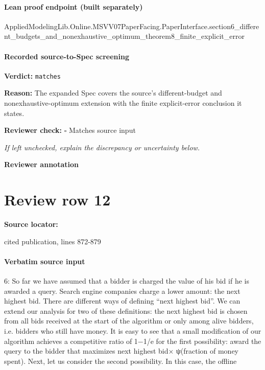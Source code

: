 \documentclass[10pt]{article}
\newcommand{\reviewerbox}{%
  \par\noindent\fbox{\parbox{0.96\linewidth}{\rule{0pt}{0.38in}}}\par
}
\newcommand{\reviewmatch}[1]{%
  \par\noindent\textbf{Reviewer check:} $\square$\; #1\par
  \noindent\emph{If left unchecked, explain the discrepancy or uncertainty below.}\par
}
\begin{document}
\paragraph{Lean proof endpoint (built separately)}\begin{ReviewVerbatim}
AppliedModelingLib.Online.MSVV07PaperFacing.PaperInterface.section6_different_budgets_and_nonexhaustive_optimum_theorem8_finite_explicit_error
\end{ReviewVerbatim}

\paragraph{Recorded source-to-Spec screening}
\textbf{Verdict:} \texttt{matches}
\\
{\raggedright
\textbf{Reason:} The expanded Spec covers the source's different-\allowbreak{}budget and nonexhaustive-\allowbreak{}optimum extension with the finite explicit-\allowbreak{}error conclusion it states.\allowbreak{}
\par}
\reviewmatch{Matches source input}
\noindent\textbf{Reviewer annotation}\par
\reviewerbox
\clearpage
\hypertarget{source-claim-a41ed3d927625f21}{}
\section*{Review row 12}
\textbf{Source locator:} {\footnotesize\raggedright cited publication, lines 872-\allowbreak{}879\par}
\paragraph{Verbatim source input}
\begin{ReviewVerbatim}
6: So far we have assumed that a bidder is charged the value of his bid if he is awarded a query.
Search engine companies charge a lower amount: the next highest bid. There are different ways
of defining “next highest bid”. We can extend our analysis for two of these definitions: the
next highest bid is chosen from all bids received at the start of the algorithm or only among
alive bidders, i.e. bidders who still have money.
It is easy to see that a small modification of our algorithm achieves a competitive ratio of
1−1/e for the first possibility: award the query to the bidder that maximizes next highest bid×
ψ(fraction of money spent). Next, let us consider the second possibility. In this case, the offline
\end{ReviewVerbatim}
\end{document}
